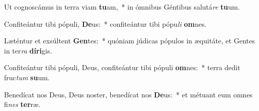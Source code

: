 \item Ut cognoscámus in terra viam \textbf{tu}am,~* in ómnibus Géntibus salutá\textit{re} \textbf{tu}um.
\item Confiteántur tibi pópuli, \textbf{De}us:~* confiteántur tibi pópu\textit{li} \textbf{om}nes.
\item Læténtur et exsúltent \textbf{Gen}tes:~* quóniam júdicas pópulos in æquitáte, et Gentes in ter\textit{ra} \textbf{dí}\textbf{ri}gis.
\item Confiteántur tibi pópuli, Deus, confiteántur tibi pópuli \textbf{om}nes:~* terra dedit fruc\textit{tum} \textbf{su}um.
\item Benedícat nos Deus, Deus noster, benedícat nos \textbf{De}us:~* et métuant eum omnes fi\textit{nes} \textbf{ter}ræ.
